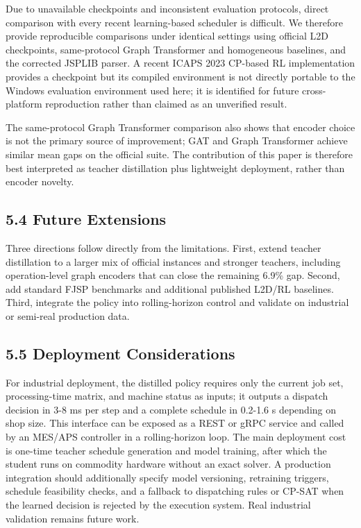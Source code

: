 \documentclass{article}
\begin{document}
Due to unavailable checkpoints and inconsistent evaluation protocols, direct comparison with every recent learning-based scheduler is difficult. We therefore provide reproducible comparisons under identical settings using official L2D checkpoints, same-protocol Graph Transformer and homogeneous baselines, and the corrected JSPLIB parser. A recent ICAPS 2023 CP-based RL implementation provides a checkpoint but its compiled environment is not directly portable to the Windows evaluation environment used here; it is identified for future cross-platform reproduction rather than claimed as an unverified result.

The same-protocol Graph Transformer comparison also shows that encoder choice is not the primary source of improvement; GAT and Graph Transformer achieve similar mean gaps on the official suite. The contribution of this paper is therefore best interpreted as teacher distillation plus lightweight deployment, rather than encoder novelty.


\subsection*{5.4 Future Extensions}

Three directions follow directly from the limitations. First, extend teacher distillation to a larger mix of official instances and stronger teachers, including operation-level graph encoders that can close the remaining 6.9\% gap. Second, add standard FJSP benchmarks and additional published L2D/RL baselines. Third, integrate the policy into rolling-horizon control and validate on industrial or semi-real production data.


\subsection*{5.5 Deployment Considerations}

For industrial deployment, the distilled policy requires only the current job set, processing-time matrix, and machine status as inputs; it outputs a dispatch decision in 3-8 ms per step and a complete schedule in 0.2-1.6 s depending on shop size. This interface can be exposed as a REST or gRPC service and called by an MES/APS controller in a rolling-horizon loop. The main deployment cost is one-time teacher schedule generation and model training, after which the student runs on commodity hardware without an exact solver. A production integration should additionally specify model versioning, retraining triggers, schedule feasibility checks, and a fallback to dispatching rules or CP-SAT when the learned decision is rejected by the execution system. Real industrial validation remains future work.
\end{document}
